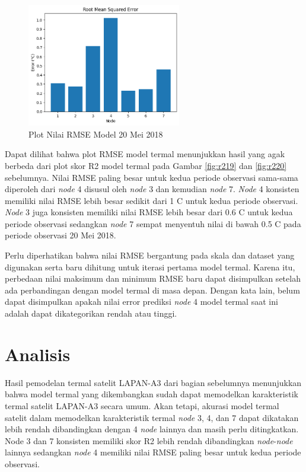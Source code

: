 \begin{figure}[H]
\setlength{}
\begin{center}
\includegraphics[width=0.6\textwidth]{fig/rmse_2018-05-20.png}
\caption{Plot Nilai RMSE Model 20 Mei 2018}
\label{fig:rmse20}
\end{center}
\end{figure}

Dapat dilihat bahwa plot RMSE model termal menunjukkan hasil yang agak berbeda
dari plot skor R2 model termal pada Gambar \ref{fig:r219} dan \ref{fig:r220}
sebelumnya. Nilai RMSE paling besar untuk kedua periode observasi sama-sama
diperoleh dari \textit{node} 4 disusul oleh \textit{node} 3 dan kemudian \textit{node} 7. \textit{Node} 4 konsisten
memiliki nilai RMSE lebih besar sedikit dari 1 \degree C untuk kedua periode
observasi. \textit{Node} 3 juga konsisten memiliki nilai RMSE lebih besar dari 0.6
\degree C untuk kedua periode observasi sedangkan \textit{node} 7 sempat menyentuh nilai
di bawah 0.5 \degree C pada periode observasi 20 Mei 2018.

Perlu diperhatikan bahwa nilai RMSE bergantung pada skala dan dataset yang
digunakan serta baru dihitung untuk iterasi pertama model termal. Karena itu,
perbedaan nilai maksimum dan minimum RMSE baru dapat disimpulkan setelah ada
perbandingan dengan model termal di masa depan. Dengan kata lain, belum dapat
disimpulkan apakah nilai error prediksi \textit{node} 4 model termal saat
ini adalah dapat dikategorikan rendah atau tinggi.

\section{Analisis}

Hasil pemodelan termal satelit LAPAN-A3 dari bagian sebelumnya menunjukkan
bahwa model termal yang dikembangkan sudah dapat memodelkan karakteristik
termal satelit LAPAN-A3 secara umum. Akan tetapi, akurasi model termal satelit
dalam memodelkan karakteristik termal \textit{node} 3, 4, dan 7 dapat dikatakan lebih
rendah dibandingkan dengan 4 \textit{node} lainnya dan masih perlu ditingkatkan. Node 3
dan 7 konsisten memiliki skor R2 lebih rendah dibandingkan \textit{node}-\textit{node} lainnya
sedangkan \textit{node} 4 memiliki nilai RMSE paling besar untuk kedua periode
observasi.

